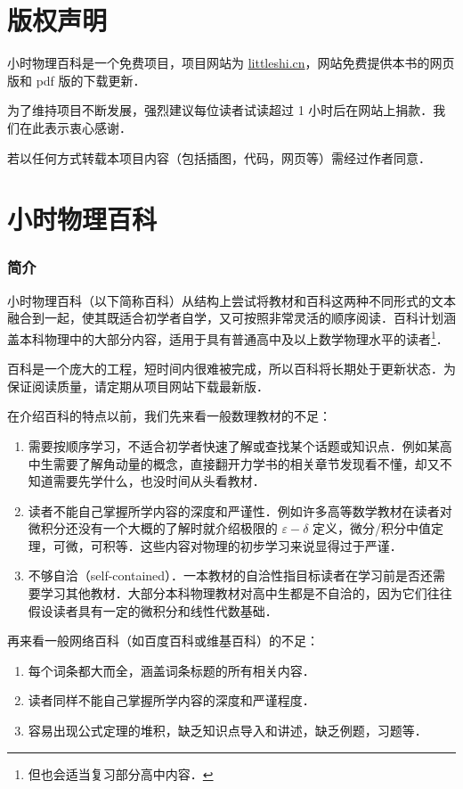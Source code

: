 
\chapter*{版权声明}

小时物理百科是一个免费项目，项目网站为 \href{http://littleshi.cn}{\color{blue}littleshi.cn}，网站免费提供本书的网页版和 pdf 版的下载更新．

为了维持项目不断发展，强烈建议每位读者试读超过 1 小时后在网站上捐款．我们在此表示衷心感谢．

若以任何方式转载本项目内容（包括插图，代码，网页等）需经过作者同意．

\chapter*{小时物理百科}

\subsection{简介}

小时物理百科（以下简称百科）从结构上尝试将教材和百科这两种不同形式的文本融合到一起，使其既适合初学者自学，又可按照非常灵活的顺序阅读．百科计划涵盖本科物理中的大部分内容，适用于具有普通高中及以上数学物理水平的读者\footnote{但也会适当复习部分高中内容．}．

百科是一个庞大的工程，短时间内很难被完成，所以百科将长期处于更新状态．为保证阅读质量，请定期从项目网站下载最新版．

在介绍百科的特点以前，我们先来看一般数理教材的不足：
\begin{enumerate}
\item 需要按顺序学习，不适合初学者快速了解或查找某个话题或知识点．例如某高中生需要了解角动量的概念，直接翻开力学书的相关章节发现看不懂，却又不知道需要先学什么，也没时间从头看教材．
\item 读者不能自己掌握所学内容的深度和严谨性．例如许多高等数学教材在读者对微积分还没有一个大概的了解时就介绍极限的 $\varepsilon-\delta$ 定义，微分/积分中值定理，可微，可积等．这些内容对物理的初步学习来说显得过于严谨．
\item 不够自洽（self-contained）．一本教材的自洽性指目标读者在学习前是否还需要学习其他教材．大部分本科物理教材对高中生都是不自洽的，因为它们往往假设读者具有一定的微积分和线性代数基础．
\end{enumerate}

再来看一般网络百科（如百度百科或维基百科）的不足：
\begin{enumerate}
\item 每个词条都大而全，涵盖词条标题的所有相关内容．
\item 读者同样不能自己掌握所学内容的深度和严谨程度．
\item 容易出现公式定理的堆积，缺乏知识点导入和讲述，缺乏例题，习题等．
\end{enumerate}


